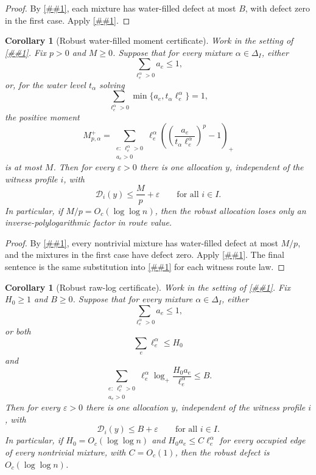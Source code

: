 \documentclass[10pt]{article}
\newcommand{\cref}[1]{\ref{##1}}
\newtheorem{corollary}[theorem]{Corollary}
\theoremstyle{definition}
\begin{document}
\begin{proof}
   By \cref{lem:waterfilled-layercake}, each mixture has water-filled defect at
   most \(B\), with defect zero in the first case.  Apply
   \cref{lem:robust-waterfilled-minimax}.
\end{proof}

\begin{corollary}[Robust water-filled moment certificate]
   \label{cor:robust-waterfilled-moment}
   Work in the setting of \cref{lem:robust-waterfilled-minimax}.  Fix
   \(p>0\) and \(M\ge0\).  Suppose that for every mixture
   \(\alpha\in\Delta_I\), either
   \[
      \sum_{\ell^\alpha_e>0}a_e\le1,
   \]
   or, for the water level \(t_\alpha\) solving
   \[
      \sum_{\ell^\alpha_e>0}\min\{a_e,t_\alpha\ell^\alpha_e\}=1,
   \]
   the positive moment
   \[
      M_{p,\alpha}^+
      =
      \sum_{\substack{e:\ \ell^\alpha_e>0\\ a_e>0}}
      \ell^\alpha_e
      \left(
      \left(\frac{a_e}{t_\alpha\ell^\alpha_e}\right)^p-1
      \right)_+
   \]
   is at most \(M\).  Then for every \(\varepsilon>0\) there
   is one allocation \(y\), independent of the witness profile \(i\), with
   \[
      \mathcal D_i(y)\le \frac Mp+\varepsilon
      \qquad\text{for all }i\in I.
   \]
   In particular, if \(M/p=O_c(\log\log n)\), then the robust allocation loses
   only an inverse-polylogarithmic factor in route value.
\end{corollary}

\begin{proof}
   By \cref{lem:waterfilled-moment-certificate}, every nontrivial mixture has
   water-filled defect at most \(M/p\), and the mixtures in the first case have
   defect zero.  Apply \cref{lem:robust-waterfilled-minimax}.  The final
   sentence is the same substitution into \cref{cor:allocation-defect-toll} for
   each witness route law.
\end{proof}

\begin{corollary}[Robust raw-log certificate]
   \label{cor:robust-waterfilled-raw-log}
   Work in the setting of \cref{lem:robust-waterfilled-minimax}.  Fix
   \(H_0\ge1\) and \(B\ge0\).  Suppose that for every mixture
   \(\alpha\in\Delta_I\), either
   \[
      \sum_{\ell^\alpha_e>0}a_e\le1,
   \]
   or both
   \[
      \sum_e\ell^\alpha_e\le H_0
   \]
   and
   \[
      \sum_{\substack{e:\ \ell^\alpha_e>0\\ a_e>0}}
      \ell^\alpha_e
      \log_+\frac{H_0a_e}{\ell^\alpha_e}
      \le B .
   \]
   Then for every \(\varepsilon>0\) there is one allocation \(y\), independent
   of the witness profile \(i\), with
   \[
      \mathcal D_i(y)\le B+\varepsilon
      \qquad\text{for all }i\in I.
   \]
   In particular, if \(H_0=O_c(\log\log n)\) and
   \(H_0a_e\le C\ell^\alpha_e\) for every occupied edge of every nontrivial
   mixture, with \(C=O_c(1)\), then the robust defect is
   \(O_c(\log\log n)\).
\end{corollary}
\end{document}
